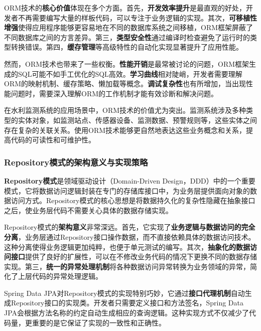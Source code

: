 ORM技术的\textbf{核心价值}体现在多个方面。首先，\textbf{开发效率提升}是最直观的好处，开发者不再需要编写大量的样板代码，可以专注于业务逻辑的实现。其次，\textbf{可移植性增强}使得应用程序能够更容易地在不同的数据库系统之间移植，ORM框架屏蔽了不同数据库之间的方言差异。第三，\textbf{类型安全性}通过编译时检查避免了运行时的类型转换错误。第四，\textbf{缓存管理}等高级特性的自动化实现显著提升了应用性能。

然而，ORM技术也带来了一些权衡。\textbf{性能开销}是最常被讨论的问题，ORM框架生成的SQL可能不如手工优化的SQL高效。\textbf{学习曲线}相对陡峭，开发者需要理解ORM的映射机制、缓存策略、懒加载等概念。\textbf{调试复杂性}也有所增加，当出现性能问题时，需要深入理解ORM的工作机制才能有效诊断和解决问题。

在水利监测系统的应用场景中，ORM技术的价值尤为突出。监测系统涉及多种类型的实体对象，如监测站点、传感器设备、监测数据、预警规则等，这些实体之间存在复杂的关联关系。使用ORM技术能够更自然地表达这些业务概念和关系，提高代码的可读性和可维护性。

\subsubsection{Repository模式的架构意义与实现策略}\label{repositoryux6a21ux5f0fux7684ux67b6ux6784ux610fux4e49ux4e0eux5b9eux73b0ux7b56ux7565}

\textbf{Repository模式}是领域驱动设计（Domain-Driven Design，DDD）中的一个重要模式，它将数据访问逻辑封装在专门的存储库接口中，为业务层提供面向对象的数据访问方式。Repository模式的核心思想是将数据持久化的复杂性隐藏在抽象接口之后，使业务层代码不需要关心具体的数据存储实现。

Repository模式的\textbf{架构意义}非常深远。首先，它实现了\textbf{业务逻辑与数据访问的完全分离}，业务层通过Repository接口操作数据，而不直接依赖具体的数据访问技术。这种分离使得业务逻辑更加纯粹，也便于单元测试的编写。其次，\textbf{抽象化的数据访问接口}提供了良好的扩展性，可以在不修改业务代码的情况下更换不同的数据存储实现。第三，\textbf{统一的异常处理机制}将各种数据访问异常转换为业务领域的异常，简化了上层代码的异常处理逻辑。

Spring Data JPA对Repository模式的实现特别巧妙，它通过\textbf{接口代理机制}自动生成Repository接口的实现类。开发者只需要定义接口和方法签名，Spring Data JPA会根据方法名称的约定自动生成相应的查询逻辑。这种实现方式不仅减少了代码量，更重要的是它保证了实现的一致性和正确性。

